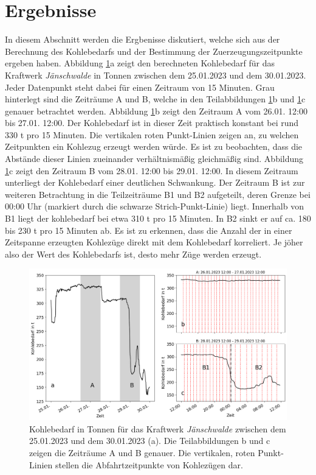 \section{Ergebnisse}

In diesem Abschnitt werden die Ergbenisse diskutiert, welche sich aus der Berechnung des Kohlebedarfs und der Bestimmung der Zuerzeugungszeitpunkte ergeben haben. Abbildung \ref{fig:results-departures}a zeigt den berechneten Kohlebedarf für das Kraftwerk \emph{Jänschwalde} in Tonnen zwischen dem 25.01.2023 und dem 30.01.2023. Jeder Datenpunkt steht dabei für einen Zeitraum von 15 Minuten. Grau hinterlegt sind die Zeiträume A und B, welche in den Teilabbildungen \ref{fig:results-departures}b und \ref{fig:results-departures}c genauer betrachtet werden. Abbildung \ref{fig:results-departures}b zeigt den Zeitraum A vom 26.01. 12:00 bis 27.01. 12:00. Der Kohlebedarf ist in dieser Zeit praktisch konstant bei rund 330 t pro 15 Minuten. Die vertikalen roten Punkt-Linien zeigen an, zu welchen Zeitpunkten ein Kohlezug erzeugt werden würde. Es ist zu beobachten, dass die Abstände dieser Linien zueinander verhältnismäßig gleichmäßig sind. Abbildung \ref{fig:results-departures}c zeigt den Zeitraum B vom 28.01. 12:00 bis 29.01. 12:00. In diesem Zeitraum unterliegt der Kohlebedarf einer deutlichen Schwankung. Der Zeitraum B ist zur weiteren Betrachtung in die Teilzeiträume B1 und B2 aufgeteilt, deren Grenze bei 00:00 Uhr (markiert durch die schwarze Strich-Punkt-Linie) liegt. Innerhalb von B1 liegt der kohlebedarf bei etwa 310 t pro 15 Minuten. In B2 sinkt er auf ca. 180 bis 230 t pro 15 Minuten ab. Es ist zu erkennen, dass die Anzahl der in einer Zeitspanne erzeugten Kohlezüge direkt mit dem Kohlebedarf korreliert. Je jöher also der Wert des Kohlebedarfs ist, desto mehr Züge werden erzeugt.

\begin{figure}[H]
	\centering
	\includegraphics[width=1.0\linewidth]{images/results/departures.png}
	\caption{Kohlebedarf in Tonnen für das Kraftwerk \emph{Jänschwalde} zwischen dem 25.01.2023 und dem 30.01.2023 (a). Die Teilabbildungen b und c zeigen die Zeiträume A und B genauer. Die vertikalen, roten Punkt-Linien stellen die Abfahrtzeitpunkte von Kohlezügen dar.}
	\label{fig:results-departures}
\end{figure}

